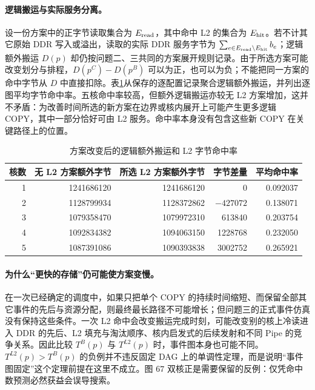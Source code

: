 \paragraph{逻辑搬运与实际服务分离。} 设一份方案中的正字节读取集合为 $E_{\rm read}$，其中命中 L2 的集合为 $E_{\rm hit}$。若不计其它原始 DDR 写入或溢出，读取的实际 DDR 服务字节为 $\sum_{e\in E_{\rm read}\setminus E_{\rm hit}}b_e$；逻辑额外搬运 $D(p)$ 却仍按问题二、三共同的方案展开规则记录。由于所选方案可能改变划分与排程，$D(p^C)-D(p^B)$ 可以为正，也可以为负；不能把同一方案的命中字节从 $D$ 中直接扣除。表\ref{tab:q3-bytes-hit}从保存的逐配置记录聚合逻辑额外搬运，并列出逐图平均字节命中率。五核命中率较高，但额外逻辑搬运亦较无 L2 方案增加，这并不矛盾：为改善时间所选的新方案在边界或核内展开上可能产生更多逻辑 COPY，其中一部分恰好可由 L2 服务。命中率本身没有包含这些新 COPY 在关键路径上的位置。
\begin{table}[!htbp]\centering\small
\caption{方案改变后的逻辑额外搬运和 L2 字节命中率}\label{tab:q3-bytes-hit}
\begin{tabular}{rrrrr}
\toprule
核数 & 无 L2 方案额外字节 & 所选 L2 方案额外字节 & 字节差量 & 平均命中率\\
\midrule
1 & 1241686120 & 1241686120 & 0 & 0.092037\\
2 & 1128799934 & 1128372862 & $-427072$ & 0.138071\\
3 & 1079358470 & 1079972310 & 613840 & 0.203754\\
4 & 1092834382 & 1094063150 & 1228768 & 0.232050\\
5 & 1087391086 & 1090393838 & 3002752 & 0.265921\\
\bottomrule
\end{tabular}
\end{table}

\paragraph{为什么“更快的存储”仍可能使方案变慢。} 在一次已经确定的调度中，如果只把单个 COPY 的持续时间缩短、而保留全部其它事件的先后与资源分配，则最终最长路径不可能增长；但问题三的正式事件仿真没有保持这些条件。一次 L2 命中会改变搬运完成时刻，可能改变别的核上冷读进入 DDR 的先后、L2 填充与淘汰顺序、核内启发式的后续发射和不同 Pipe 的竞争关系。因此比较 $T^B(p)$ 与 $T^{L2}(p)$ 时，事件图本身也可能不同。$T^{L2}(p)>T^B(p)$ 的负例并不违反固定 DAG 上的单调性定理，而是说明“事件图固定”这个定理前提在这里不成立。图 $67$ 双核正是需要保留的反例：仅凭命中数预测必然获益会误导搜索。

